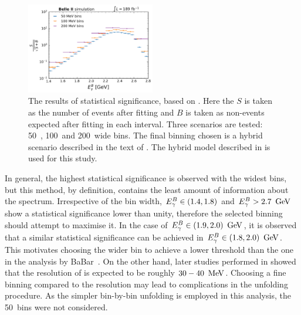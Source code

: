\begin{figure}[htbp!]
    \centering
    \includegraphics[width=0.5\textwidth]{figures/fitting/binning_significance.pdf}
    \caption{\label{fig:binning_significance}The results of statistical significance, based on .
    Here the $S$ is taken as the number of \BtoXsgamma events after fitting and $B$ is taken as non-\BtoXsgamma events expected after fitting in each \EB interval.
    Three scenarios are tested: 50~\mev, 100~\mev and 200~\mev wide bins.
    The final binning chosen is a hybrid scenario described in the text of .
    The hybrid model described in  is used for this study.
    }    
\end{figure}

In general, the highest statistical significance is observed with the widest bins, but this method, by definition, contains the least amount of information about the spectrum.
Irrespective of the bin width,  ${E^B_{\gamma}}\in(1.4,1.8)$ and ${E^B_{\gamma}}>2.7~\mathrm{\,Ge\kern -0.1em V}$ show a statistical significance lower than unity, therefore the selected binning should attempt to maximise it.
In the case of ${E^B_{\gamma}}\in(1.9,2.0)~\mathrm{\,Ge\kern -0.1em V}$, it is observed that a similar statistical significance can be achieved in ${E^B_{\gamma}}\in(1.8,2.0)~\mathrm{\,Ge\kern -0.1em V}$.
This motivates choosing the wider bin to achieve a lower threshold than the one in the analysis by BaBar~\cite{BaBar:2007yhb}.
On the other hand, later studies performed in  showed that the resolution of \EB is expected to be roughly $30-40~\mathrm{\,Me\kern -0.1em V}$.
Choosing a fine binning \EB compared to the resolution may lead to complications in the unfolding procedure.
As the simpler bin-by-bin unfolding is employed in this analysis, the 50~\mev bins were not considered.

